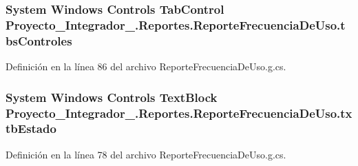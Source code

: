 \hypertarget{class_proyecto___integrador__3_1_1_reportes_1_1_reporte_frecuencia_de_uso_a33854de6395bbc0369295eec9598bba5}{
\subsubsection[{tbs\-Controles}]{\setlength{\rightskip}{0pt plus 5cm}System Windows Controls Tab\-Control Proyecto\-\_\-\-Integrador\-\_.\-Reportes.\-Reporte\-Frecuencia\-De\-Uso.\-tbs\-Controles\hspace{0.3cm}{\ttfamily [package]}}}\label{class_proyecto___integrador__3_1_1_reportes_1_1_reporte_frecuencia_de_uso_a33854de6395bbc0369295eec9598bba5}


Definición en la línea 86 del archivo Reporte\-Frecuencia\-De\-Uso.\-g.\-cs.

\hypertarget{class_proyecto___integrador__3_1_1_reportes_1_1_reporte_frecuencia_de_uso_ab5dad4dbd48cba1238ec0914d940c499}{
\subsubsection[{txtb\-Estado}]{\setlength{\rightskip}{0pt plus 5cm}System Windows Controls Text\-Block Proyecto\-\_\-\-Integrador\-\_.\-Reportes.\-Reporte\-Frecuencia\-De\-Uso.\-txtb\-Estado\hspace{0.3cm}{\ttfamily [package]}}}\label{class_proyecto___integrador__3_1_1_reportes_1_1_reporte_frecuencia_de_uso_ab5dad4dbd48cba1238ec0914d940c499}


Definición en la línea 78 del archivo Reporte\-Frecuencia\-De\-Uso.\-g.\-cs.

